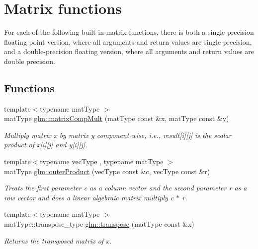 \hypertarget{group__core__func__matrix}{\section{Matrix functions}
\label{group__core__func__matrix}
}


For each of the following built-\/in matrix functions, there is both a single-\/precision floating point version, where all arguments and return values are single precision, and a double-\/precision floating version, where all arguments and return values are double precision.  


\subsection*{Functions}
\begin{DoxyCompactItemize}
\item 
{\footnotesize template$<$typename mat\-Type $>$ }\\mat\-Type \hyperlink{group__core__func__matrix_ga0e48491a51b3f366d671c01894705605}{glm\-::matrix\-Comp\-Mult} (mat\-Type const \&x, mat\-Type const \&y)
\begin{DoxyCompactList}\small\item\em Multiply matrix x by matrix y component-\/wise, i.\-e., result\mbox{[}i\mbox{]}\mbox{[}j\mbox{]} is the scalar product of x\mbox{[}i\mbox{]}\mbox{[}j\mbox{]} and y\mbox{[}i\mbox{]}\mbox{[}j\mbox{]}. \end{DoxyCompactList}\item 
{\footnotesize template$<$typename vec\-Type , typename mat\-Type $>$ }\\mat\-Type \hyperlink{group__core__func__matrix_ga5d896e8651512fc098a677dbe403eeac}{glm\-::outer\-Product} (vec\-Type const \&c, vec\-Type const \&r)
\begin{DoxyCompactList}\small\item\em Treats the first parameter c as a column vector and the second parameter r as a row vector and does a linear algebraic matrix multiply c $\ast$ r. \end{DoxyCompactList}\item 
{\footnotesize template$<$typename mat\-Type $>$ }\\mat\-Type\-::transpose\-\_\-type \hyperlink{group__core__func__matrix_gac58a4106a57fb7da41b3aeae3832998b}{glm\-::transpose} (mat\-Type const \&x)
\begin{DoxyCompactList}\small\item\em Returns the transposed matrix of x. \end{DoxyCompactList}\item 

\end{DoxyCompactItemize}
